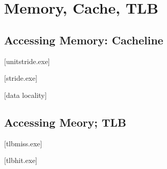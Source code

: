 \documentclass[main]{subfiles}
\begin{document}
\section{Memory, Cache, TLB}
\subsection{Accessing Memory: Cacheline}
[unitstride.exe]

[stride.exe]

[data locality]

\subsection{Accessing Meory; TLB}
[tlbmiss.exe]

[tlbhit.exe] 
\end{document}
